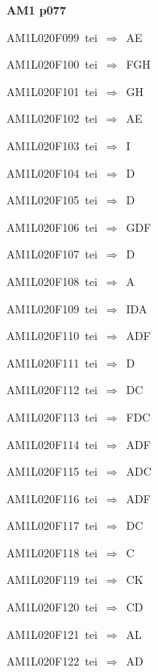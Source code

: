 \par\vfill\eject
{\bf\hfill AM1 p077\hfill\hbox{}}\par\bigskip
{\sixrm AM1L020F099\ {\sixit tei}\ }$\Rightarrow$\ AE\par\smallskip
{\sixrm AM1L020F100\ {\sixit tei}\ }$\Rightarrow$\ FGH\par\smallskip
{\sixrm AM1L020F101\ {\sixit tei}\ }$\Rightarrow$\ GH\par\smallskip
{\sixrm AM1L020F102\ {\sixit tei}\ }$\Rightarrow$\ AE\par\smallskip
{\sixrm AM1L020F103\ {\sixit tei}\ }$\Rightarrow$\ I\par\smallskip
{\sixrm AM1L020F104\ {\sixit tei}\ }$\Rightarrow$\ D\par\smallskip
{\sixrm AM1L020F105\ {\sixit tei}\ }$\Rightarrow$\ D\par\smallskip
{\sixrm AM1L020F106\ {\sixit tei}\ }$\Rightarrow$\ GDF\par\smallskip
{\sixrm AM1L020F107\ {\sixit tei}\ }$\Rightarrow$\ D\par\smallskip
{\sixrm AM1L020F108\ {\sixit tei}\ }$\Rightarrow$\ A\par\smallskip
{\sixrm AM1L020F109\ {\sixit tei}\ }$\Rightarrow$\ IDA\par\smallskip
{\sixrm AM1L020F110\ {\sixit tei}\ }$\Rightarrow$\ ADF\par\smallskip
{\sixrm AM1L020F111\ {\sixit tei}\ }$\Rightarrow$\ D\par\smallskip
{\sixrm AM1L020F112\ {\sixit tei}\ }$\Rightarrow$\ DC\par\smallskip
{\sixrm AM1L020F113\ {\sixit tei}\ }$\Rightarrow$\ FDC\par\smallskip
{\sixrm AM1L020F114\ {\sixit tei}\ }$\Rightarrow$\ ADF\par\smallskip
{\sixrm AM1L020F115\ {\sixit tei}\ }$\Rightarrow$\ ADC\par\smallskip
{\sixrm AM1L020F116\ {\sixit tei}\ }$\Rightarrow$\ ADF\par\smallskip
{\sixrm AM1L020F117\ {\sixit tei}\ }$\Rightarrow$\ DC\par\smallskip
{\sixrm AM1L020F118\ {\sixit tei}\ }$\Rightarrow$\ C\par\smallskip
{\sixrm AM1L020F119\ {\sixit tei}\ }$\Rightarrow$\ CK\par\smallskip
{\sixrm AM1L020F120\ {\sixit tei}\ }$\Rightarrow$\ CD\par\smallskip
{\sixrm AM1L020F121\ {\sixit tei}\ }$\Rightarrow$\ AL\par\smallskip
{\sixrm AM1L020F122\ {\sixit tei}\ }$\Rightarrow$\ AD\par\smallskip

